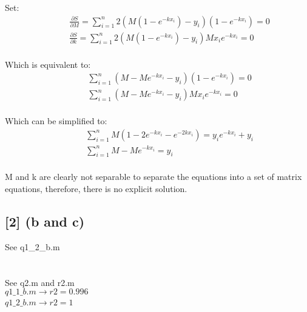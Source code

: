 \documentclass[paper=a4, fontsize=12pt]{article}%
\begin{document}
Set: \\
\begin{equation}
	\begin{aligned}
		& \qquad \frac{\partial S}{\partial M} = \sum_{i=1}^{n} 2(M(1-e^{-kx_i})-y_i)(1-e^{-kx_i}) = 0 \\
		& \qquad \frac{\partial S}{\partial k} = \sum_{i=1}^{n} 2(M(1-e^{-kx_i})-y_i)Mx_ie^{-kx_i} = 0 \\
	\end{aligned}
\end{equation}

Which is equivalent to: \\
\begin{equation}
	\begin{aligned}
		& \qquad \sum_{i=1}^{n} (M-Me^{-kx_i}-y_i) (1-e^{-kx_i}) = 0\\
		& \qquad \sum_{i=1}^{n} (M-Me^{-kx_i}-y_i) Mx_ie^{-kx_i} = 0\\
	\end{aligned}
\end{equation}

Which can be simplified to: \\
\begin{equation}
	\begin{aligned}
		& \qquad \sum_{i=1}^{n} M(1-2e^{-kx_i}-e^{-2kx_i}) = y_ie^{-kx_i} + y_i\\
		& \qquad \sum_{i=1}^{n} M - Me^{-kx_i} = y_i\\
	\end{aligned}
\end{equation}

M and k are clearly not separable to separate the equations into a set of matrix equations, therefore, there is no explicit solution.

\subsection{[2] (b and c)}
See q1\_2\_b.m
\section{ }
See q2.m and r2.m \\

$q1\_1\_b.m \rightarrow r2 = 0.996$ \\

$q1\_2\_b.m \rightarrow r2 = 1$\
\end{document}
